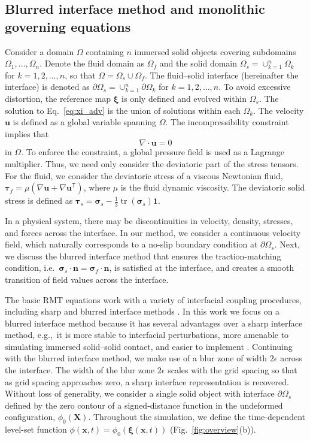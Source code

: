 \documentclass[times, 10pt]{article}
\renewcommand{\vec}[1]{\mathbf{#1}}
\newcommand{\vu}{\vec{u}}
\newcommand{\nor}{\vec{n}}
\newcommand{\vx}{\vec{x}}
\newcommand{\vX}{\vec{X}}
\newcommand{\Ident}{\mathbf{1}}
\newcommand{\vxi}{\boldsymbol\xi}
\newcommand{\vsigma}{\boldsymbol\sigma}
\newcommand{\vtau}{\boldsymbol\tau}
\newcommand{\trans}{\mathsf{T}}
\DeclareMathOperator{\Tr}{tr}
\begin{document}
\begin{multicols}{2}
\subsection*{Blurred interface method and monolithic governing equations}
Consider a domain $\Omega$ containing $n$ immersed solid objects covering subdomains $\Omega_1,\ldots,\Omega_n$.
Denote the fluid domain as $\Omega_f$ and the solid domain $\Omega_s = \cup_{k=1}^{n} \Omega_k$ for $k=1,2,\ldots,n$, so that $\Omega = \Omega_s \cup \Omega_f$.
The fluid--solid interface (hereinafter the interface) is denoted as $\partial \Omega_s = \cup_{k=1}^{n} \partial \Omega_k$ for $k=1,2,\ldots,n$.
%
To avoid excessive distortion, the reference map $\vxi$ is only defined and evolved within $\Omega_s$.
The solution to Eq.~\eqref{eq:xi_adv} is the union of solutions within each $\Omega_k$.
The velocity $\vu$ is defined as a global variable spanning $\Omega$. The incompressibility constraint implies that
%
\begin{equation}
\label{eq:incomp}
\nabla \cdot \vu = 0
\end{equation}
%
in $\Omega$. To enforce the constraint, a global pressure field is used as a Lagrange multiplier.
Thus, we need only consider the deviatoric part of the stress tensors.
For the fluid, we consider the deviatoric stress of a viscous Newtonian fluid,
$ \vtau_f = \mu \left(\nabla \vu + \nabla\vu^\trans \right)$,
where $\mu$ is the fluid dynamic viscosity.
%
The deviatoric solid stress is defined as $ \vtau_s = \vsigma_s - \tfrac13 \Tr ( \vsigma_s)\Ident$.

In a physical system, there may be discontinuities in velocity, density, stresses, and forces across the interface.
In our method, we consider a continuous velocity field, which naturally corresponds to a no-slip boundary condition at $\partial \Omega_s$.
%
Next, we discuss the blurred interface method that ensures the traction-matching condition, i.e.~$\vsigma_s \cdot \nor  = \vsigma_f \cdot \nor$,
is satisfied at the interface, and creates a smooth transition of field values across the interface.

The basic RMT equations work with a variety of interfacial coupling procedures, including sharp and blurred interface methods \cite{kamrin12, valkov15, rycroft20}.
In this work we focus on a blurred interface method because it has
several advantages over a sharp interface method,
e.g.,~it is more stable to interfacial perturbations, more amenable to simulating immersed solid--solid contact, and easier to implement \cite{valkov15, rycroft20}.
%
Continuing with the blurred interface method, we make use of a blur zone of width $2\epsilon$ across the interface.
The width of the blur zone $2\epsilon$ scales with the grid spacing so that as grid spacing approaches zero, a sharp interface representation is recovered.
Without loss of generality, we consider a single solid object with interface $\partial \Omega_{s}$ defined by the zero contour of a signed-distance function in the undeformed configuration, $\phi_0(\vX)$.
Throughout the simulation, we define the time-dependent level-set function $\phi(\vx,t) = \phi_0(\vxi(\vx,t))$ (Fig.~\ref{fig:overview}(b)).


\end{multicols}
\end{document}
